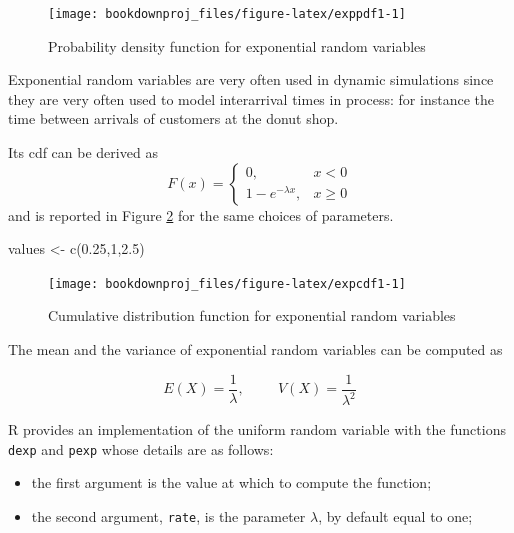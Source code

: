 \documentclass[
]{book}
\newenvironment{Shaded}{\begin{snugshade}}{\end{snugshade}}
\newcommand{\DecValTok}[1]{\textcolor[rgb]{0.00,0.00,0.81}{#1}}
\newcommand{\FloatTok}[1]{\textcolor[rgb]{0.00,0.00,0.81}{#1}}
\newcommand{\FunctionTok}[1]{\textcolor[rgb]{0.00,0.00,0.00}{#1}}
\newcommand{\NormalTok}[1]{#1}
\newcommand{\OtherTok}[1]{\textcolor[rgb]{0.56,0.35,0.01}{#1}}
\theoremstyle{definition}
\theoremstyle{definition}
\theoremstyle{definition}
\theoremstyle{definition}
\theoremstyle{remark}
\begin{document}
\begin{figure}

{\centering \texttt{[image: bookdownproj\_files/figure-latex/exppdf1-1]} 

}

\caption{Probability density function for exponential random variables}\label{fig:exppdf1}
\end{figure}

Exponential random variables are very often used in dynamic simulations since they are very often used to model interarrival times in process: for instance the time between arrivals of customers at the donut shop.

Its cdf can be derived as
\[
F(x)=\left\{
\begin{array}{ll}
0, & x <0\\
1-e^{-\lambda x}, & x\geq 0
\end{array}
\right.
\]
and is reported in Figure \ref{fig:expcdf1} for the same choices of parameters.

\begin{Shaded}
\begin{Highlighting}[]
\NormalTok{values }\OtherTok{\textless{}{-}} \FunctionTok{c}\NormalTok{(}\FloatTok{0.25}\NormalTok{,}\DecValTok{1}\NormalTok{,}\FloatTok{2.5}\NormalTok{)}
\end{Highlighting}
\end{Shaded}

\begin{figure}

{\centering \texttt{[image: bookdownproj\_files/figure-latex/expcdf1-1]} 

}

\caption{Cumulative distribution function for exponential random variables}\label{fig:expcdf1}
\end{figure}

The mean and the variance of exponential random variables can be computed as

\[
E(X)=\frac{1}{\lambda}, \hspace{1cm} V(X)=\frac{1}{\lambda^2}
\]

R provides an implementation of the uniform random variable with the functions \texttt{dexp} and \texttt{pexp} whose details are as follows:

\begin{itemize}
\item
  the first argument is the value at which to compute the function;
\item
  the second argument, \texttt{rate}, is the parameter \(\lambda\), by default equal to one;
\end{itemize}
\end{document}
